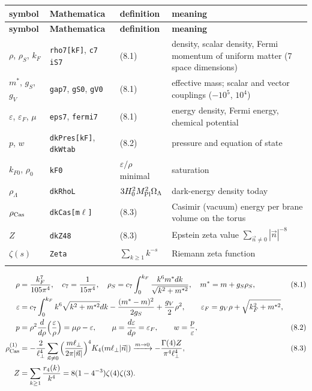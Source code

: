 \documentclass[10pt,a4paper]{article}
\begin{document}
{\small
\begin{longtable}{>{\raggedright\arraybackslash}p{}>{\raggedright\arraybackslash}p{}>{\raggedright\arraybackslash}p{}>{\raggedright\arraybackslash}p{}}
\toprule
\textbf{symbol} & \textbf{Mathematica} & \textbf{definition} & \textbf{meaning} \\
\midrule\endfirsthead
\toprule
\textbf{symbol} & \textbf{Mathematica} & \textbf{definition} & \textbf{meaning} \\
\midrule\endhead
\endfoot
\bottomrule\endlastfoot
$\rho$, $\rho_S$, $k_F$ & \texttt{rho7[kF]}, \texttt{c7 iS7} & (8.1) & density, scalar density, Fermi momentum of uniform matter (7 space dimensions) \\
$m^*$, $g_S$, $g_V$ & \texttt{gap7}, \texttt{gS0}, \texttt{gV0} & (8.1) & effective mass; scalar and vector couplings ($-10^5$, $10^4$) \\
$\varepsilon$, $\varepsilon_F$, $\mu$ & \texttt{eps7}, \texttt{fermi7} & (8.1) & energy density, Fermi energy, chemical potential \\
$p$, $w$ & \texttt{dkPres[kF]}, \texttt{dkWtab} & (8.2) & pressure and equation of state \\
$k_{F0}$, $\rho_0$ & \texttt{kF0} & $\varepsilon/\rho$ minimal & saturation \\
$\rho_\Lambda$ & \texttt{dkRhoL} & $3H_0^2M_{\rm Pl}^2\Omega_\Lambda$ & dark-energy density today \\
$\rho_{\rm Cas}$ & \texttt{dkCas[m\texorpdfstring{\ensuremath{\ell}}{ℓ}]} & (8.3) & Casimir (vacuum) energy per brane volume on the torus \\
$Z$ & \texttt{dkZ48} & (8.3) & Epstein zeta value $\sum_{\vec n\ne0}|\vec n|^{-8}$ \\
$\zeta(s)$ & \texttt{Zeta} & $\sum_{k\ge1}k^{-s}$ & Riemann zeta function \\*
\end{longtable}}
\begin{align*}
\rho&=\frac{k_F^7}{105\pi^4},\quad c_7=\frac1{15\pi^4},\quad \rho_S=c_7\int_0^{k_F}\frac{k^6m^*dk}{\sqrt{k^2+m^{*2}}},\quad m^*=m+g_S\rho_S,&&(8.1) \\
\varepsilon&=c_7\int_0^{k_F}k^6\sqrt{k^2+m^{*2}}dk-\frac{(m^*-m)^2}{2g_S}+\frac{g_V}2\rho^2,\qquad \varepsilon_F=g_V\rho+\sqrt{k_F^2+m^{*2}}, \\
p&=\rho^2\frac{d}{d\rho}\Big(\frac\varepsilon\rho\Big)=\mu\rho-\varepsilon,\qquad \mu=\frac{d\varepsilon}{d\rho}=\varepsilon_F,\qquad w=\frac p\varepsilon,&&(8.2) \\
\rho_{\rm Cas}^{(1)}&=-\frac2{\ell_\perp^4}\sum_{\vec n\ne0}\Big(\frac{m\ell_\perp}{2\pi|\vec n|}\Big)^4K_4(m\ell_\perp|\vec n|)\xrightarrow{m\to0}-\frac{\Gamma(4)Z}{\pi^4\ell_\perp^4},&&(8.3) \\
Z&=\sum_{k\ge1}\frac{r_4(k)}{k^4}=8(1-4^{-3})\zeta(4)\zeta(3).
\end{align*}
\end{document}
